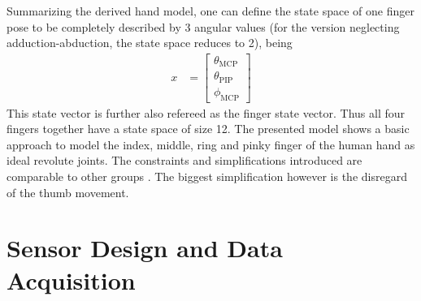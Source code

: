 Summarizing the derived hand model, one can define the state space of one finger pose to be completely described by 3 angular values (for the version neglecting adduction-abduction, the state space reduces to 2), being
\begin{equation*}
\begin{aligned}
x &= \begin{bmatrix}
				\theta_{\mathrm{MCP}}\\
				\theta_{\mathrm{PIP}}\\
				\phi_{\mathrm{MCP}}
\end{bmatrix}
\end{aligned}
\end{equation*}
This state vector is further also refereed as the finger state vector. Thus all four fingers together have a state space of size 12. The presented model shows a basic approach to model the index, middle, ring and pinky finger of the human hand as ideal revolute joints. The constraints and simplifications introduced are comparable to other groups \cite{lin2000modeling}. The biggest simplification however is the disregard of the thumb movement.

\FloatBarrier

\section{Sensor Design and Data Acquisition} \label{cha:sensors}

